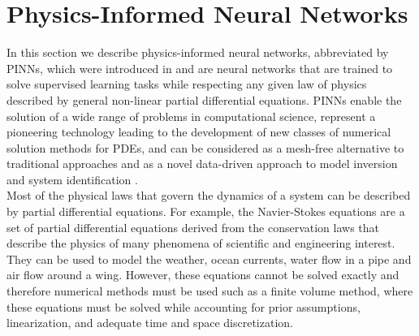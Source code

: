 \section{Physics-Informed Neural Networks}
\label{ch1:sec4}

In this section we describe physics-informed neural networks, abbreviated by PINNs, which  were introduced in \cite{RaissiPerdikarisKarniadakisPart1:2017} and are neural networks that are trained to solve supervised learning tasks while respecting any given law of physics described by general non-linear partial differential equations. PINNs enable the solution of a wide range of problems in computational science, represent a pioneering technology leading to the development of new classes of numerical solution methods for PDEs, and can be considered as a mesh-free alternative to traditional approaches and as a novel data-driven approach to model inversion and system identification \cite[p.~3]{RaissiPerdikarisKarniadakis:2019}. \\
Most of the physical laws that govern the dynamics of a system can be described by partial differential equations. For example, the Navier-Stokes equations are a set of partial differential equations derived from the conservation laws that describe the physics of many phenomena of scientific and engineering interest. They can be used to model the weather, ocean currents, water flow in a pipe and air flow around a wing. However, these equations cannot be solved exactly and therefore numerical methods must be used such as a finite volume method, where these equations must be solved while accounting for prior assumptions, linearization, and adequate time and space discretization. \\
